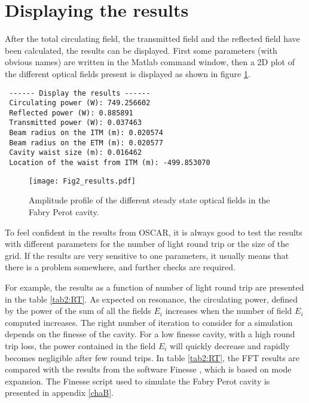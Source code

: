 \section{Displaying the results}
\label{sec2:5}
After the total circulating field, the transmitted field and the reflected field have been calculated, the results can be displayed. First some parameters (with obvious names) are written in the Matlab command window, then a 2D plot of the different optical fields present is displayed as shown in figure \ref{fig2:display}.

\begin{verbatim}
 ------ Display the results ------
 Circulating power (W): 749.256602
 Reflected power (W): 0.885891
 Transmitted power (W): 0.037463
 Beam radius on the ITM (m): 0.020574
 Beam radius on the ETM (m): 0.020577
 Cavity waist size (m): 0.016462
 Location of the waist from ITM (m): -499.853070
\end{verbatim}

\begin{figure}
\begin{center}
\texttt{[image: Fig2\_results.pdf]}
\end{center}
\caption{\label{fig2:display} Amplitude profile of the different steady state optical fields in the Fabry Perot cavity. }
\end{figure}

To feel confident in the results from OSCAR, it is always good to test the results with different parameters for the number of light round trip or the size of the grid. If the results are very sensitive to one parameters, it usually means that there is a problem somewhere, and further checks are required.

For example, the results as a function of number of light round trip are presented in the table \ref{tab2:RT}. As expected on resonance, the circulating power, defined by the power of the sum of all the fields $E_i$ increases when the number of field $E_i$ computed increases. The right number of iteration to consider for a simulation depends on the finesse of the cavity. For a low finesse cavity, with a high round trip loss, the power contained in the field $E_i$ will quickly decrease and rapidly becomes negligible after few round trips. In table \ref{tab2:RT}, the FFT results are compared with the results from the software Finesse \cite{Finesse}, which is based on mode expansion. The Finesse script used to simulate the Fabry Perot cavity is presented in appendix \ref{chaB}.\\

